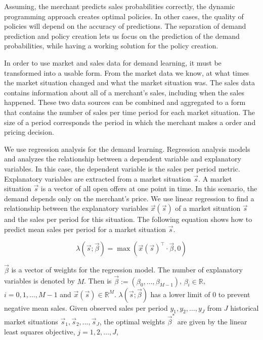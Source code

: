 Assuming, the merchant predicts sales probabilities correctly, the dynamic programming approach creates optimal policies.
In other cases, the quality of policies will depend on the accuracy of predictions. 
The separation of demand prediction and policy creation lets us focus on the prediction of the demand probabilities, while having a working solution for the policy creation.

In order to use market and sales data for demand learning, it must be transformed into a usable form.
From the market data we know, at what times the market situation changed and what the market situation was.
The sales data contains information about all of a merchant's sales, including when the sales happened.
These two data sources can be combined and aggregated to a form that contains the number of sales per time period for each market situation.
The size of a period corresponds the period in which the merchant makes a order and pricing decision.

We use regression analysis for the demand learning.
Regression analysis models and analyzes the relationship between a dependent variable and explanatory variables.
In this case, the dependent variable is the sales per period metric.
Explanatory variables are extracted from a market situation $\vec{s}$.
A market situation $\vec{s}$ is a vector of all open offers at one point in time.
In this scenario, the demand depends only on the merchant's price.
We use linear regression to find a relationship between the explanatory variables $\vec{x}(\vec{s})$ of a market situation $\vec{s}$ and the sales per period for this situation.
The following equation shows how to predict mean sales per period for a market situation $\vec{s}$.

\begin{equation}
\label{eq:linear_regression}
\lambda(\vec{s}; \vec{\beta}) = \max(\vec{x}(\vec{s})^\intercal \cdot \vec{\beta}, 0)
\end{equation}

$\vec{\beta}$ is a vector of weights for the regression model.
The number of explanatory variables is denoted by $M$.
Then is $\vec{\beta} := (\beta_0, \ldots, \beta_{M-1})$, $\beta_i \in \mathbb{R}$, $i=0, 1, \ldots, M-1$ and $\vec{x}(\vec{s}) \in \mathbb{R}^M$.
$\lambda(\vec{s}; \vec{\beta})$ has a lower limit of 0 to prevent negative mean sales.
Given observed sales per period $y_1, y_2, \ldots, y_J$ from $J$ historical market situations $\vec{s}_1, \vec{s}_2, \ldots, \vec{s}_J$, the optimal weights $\vec{\beta}^*$ are given by the linear least squares objective, $j=1, 2, \ldots, J$,

